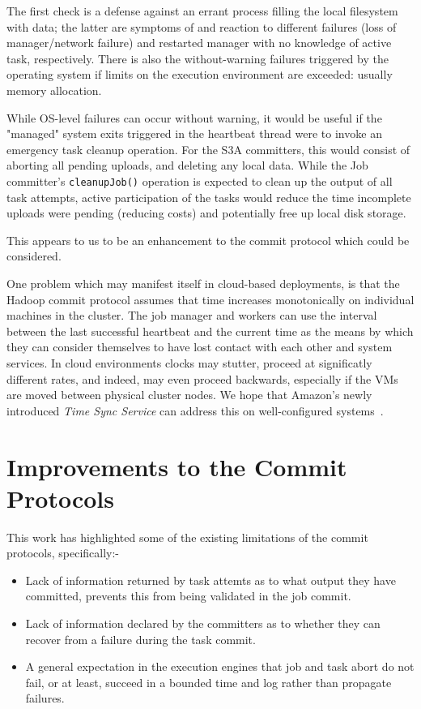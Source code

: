 \documentclass[conference]{IEEEtran}
\begin{document}
The first check is a defense against an errant process filling the local
filesystem with data;
the latter are symptoms of and reaction to different failures (loss of manager/network failure)
and restarted manager with no knowledge of active task, respectively.
There is also the without-warning failures triggered by the operating system
if limits on the execution environment are exceeded: usually memory allocation.

While OS-level failures can occur without warning, it would be useful if the
"managed" system exits triggered in the heartbeat thread were to invoke
an emergency task cleanup operation.
For the S3A committers, this would consist of aborting all pending uploads, and
deleting any local data.
While the Job committer's \texttt{cleanupJob()} operation is expected to clean up
the output of all task attempts, active participation of the tasks would
reduce the time incomplete uploads were pending (reducing costs) and
potentially free up local disk storage.

This appears to us to be an enhancement to the commit protocol which could
be considered.


One problem which may manifest itself in cloud-based deployments,
is that the Hadoop commit protocol assumes that time increases monotonically
on individual machines in the cluster.
The job manager and workers can use the interval between the last successful heartbeat
and the current time as the means by which they can consider themselves to have lost
contact with each other and system services.
In cloud environments clocks may stutter, proceed at significatly different rates,
and indeed, may even proceed backwards, especially if the VMs are moved between
physical cluster nodes.
We hope that Amazon's newly introduced \emph{Time Sync Service}
can address this on well-configured systems\ \cite{AWS-clock-service}.



\section{Improvements to the Commit Protocols}
\label{sec:improvementsToTheCommitProtocols}


This work has highlighted some of the existing limitations of the commit protocols,
specifically:-

\begin{itemize}
  \item Lack of information returned by task attemts as to what output they have committed,
  prevents this from being validated in the job commit.
  \item Lack of information declared by the committers as to whether they can
  recover from a failure during the task commit.
  \item A general expectation in the execution engines that job and task abort do
  not fail, or at least, succeed in a bounded time and log rather than propagate
  failures.
\end{itemize}
\end{document}
